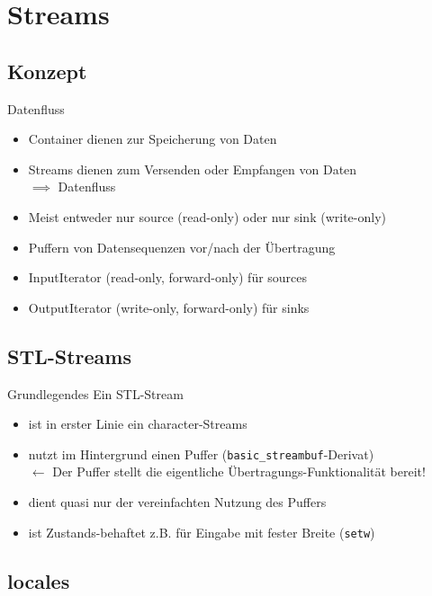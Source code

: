 \section{Streams}


\subsection{Konzept}

\begin{frame}{Datenfluss}
	\begin{itemize}
		\item Container dienen zur Speicherung von Daten
		\item Streams dienen zum Versenden oder Empfangen von Daten\\
		      $\implies$ Datenfluss
		\item Meist entweder nur source (read-only) oder nur sink (write-only)
		\item Puffern von Datensequenzen vor/nach der Übertragung
		\item InputIterator (read-only, forward-only) für sources
		\item OutputIterator (write-only, forward-only) für sinks
	\end{itemize}
\end{frame}


\subsection{STL-Streams}

\begin{frame}{Grundlegendes}
	Ein STL-Stream
	\begin{itemize}
		\item ist in erster Linie ein character-Streams
		\item nutzt im Hintergrund einen Puffer (\texttt{basic\_streambuf}-Derivat)\\
			$\leftarrow$ Der Puffer stellt die eigentliche Übertragungs-Funktionalität bereit!
		\item dient quasi nur der vereinfachten Nutzung des Puffers
		\item ist Zustands-behaftet z.B. für Eingabe mit fester Breite (\texttt{setw})
	\end{itemize}
\end{frame}


\subsection{locales}

